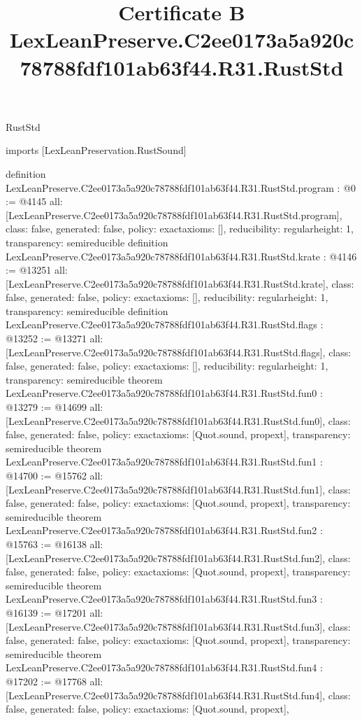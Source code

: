 \begin{lexlean}{RustStd}
\title{Certificate B LexLeanPreserve.C2ee0173a5a920c78788fdf101ab63f44.R31.RustStd}
\begin{coremodule}
imports [LexLeanPreservation.RustSound]

definition LexLeanPreserve.C2ee0173a5a920c78788fdf101ab63f44.R31.RustStd.program : @0 := @4145 {
  all: [LexLeanPreserve.C2ee0173a5a920c78788fdf101ab63f44.R31.RustStd.program],
  class: false,
  generated: false,
  policy: exact{axioms: []},
  reducibility: regular{height: 1},
  transparency: semireducible
}
definition LexLeanPreserve.C2ee0173a5a920c78788fdf101ab63f44.R31.RustStd.krate : @4146 := @13251 {
  all: [LexLeanPreserve.C2ee0173a5a920c78788fdf101ab63f44.R31.RustStd.krate],
  class: false,
  generated: false,
  policy: exact{axioms: []},
  reducibility: regular{height: 1},
  transparency: semireducible
}
definition LexLeanPreserve.C2ee0173a5a920c78788fdf101ab63f44.R31.RustStd.flags : @13252 := @13271 {
  all: [LexLeanPreserve.C2ee0173a5a920c78788fdf101ab63f44.R31.RustStd.flags],
  class: false,
  generated: false,
  policy: exact{axioms: []},
  reducibility: regular{height: 1},
  transparency: semireducible
}
theorem LexLeanPreserve.C2ee0173a5a920c78788fdf101ab63f44.R31.RustStd.fun0 : @13279 := @14699 {
  all: [LexLeanPreserve.C2ee0173a5a920c78788fdf101ab63f44.R31.RustStd.fun0],
  class: false,
  generated: false,
  policy: exact{axioms: [Quot.sound, propext]},
  transparency: semireducible
}
theorem LexLeanPreserve.C2ee0173a5a920c78788fdf101ab63f44.R31.RustStd.fun1 : @14700 := @15762 {
  all: [LexLeanPreserve.C2ee0173a5a920c78788fdf101ab63f44.R31.RustStd.fun1],
  class: false,
  generated: false,
  policy: exact{axioms: [Quot.sound, propext]},
  transparency: semireducible
}
theorem LexLeanPreserve.C2ee0173a5a920c78788fdf101ab63f44.R31.RustStd.fun2 : @15763 := @16138 {
  all: [LexLeanPreserve.C2ee0173a5a920c78788fdf101ab63f44.R31.RustStd.fun2],
  class: false,
  generated: false,
  policy: exact{axioms: [Quot.sound, propext]},
  transparency: semireducible
}
theorem LexLeanPreserve.C2ee0173a5a920c78788fdf101ab63f44.R31.RustStd.fun3 : @16139 := @17201 {
  all: [LexLeanPreserve.C2ee0173a5a920c78788fdf101ab63f44.R31.RustStd.fun3],
  class: false,
  generated: false,
  policy: exact{axioms: [Quot.sound, propext]},
  transparency: semireducible
}
theorem LexLeanPreserve.C2ee0173a5a920c78788fdf101ab63f44.R31.RustStd.fun4 : @17202 := @17768 {
  all: [LexLeanPreserve.C2ee0173a5a920c78788fdf101ab63f44.R31.RustStd.fun4],
  class: false,
  generated: false,
  policy: exact{axioms: [Quot.sound, propext]},
}
\end{coremodule}
\end{lexlean}
